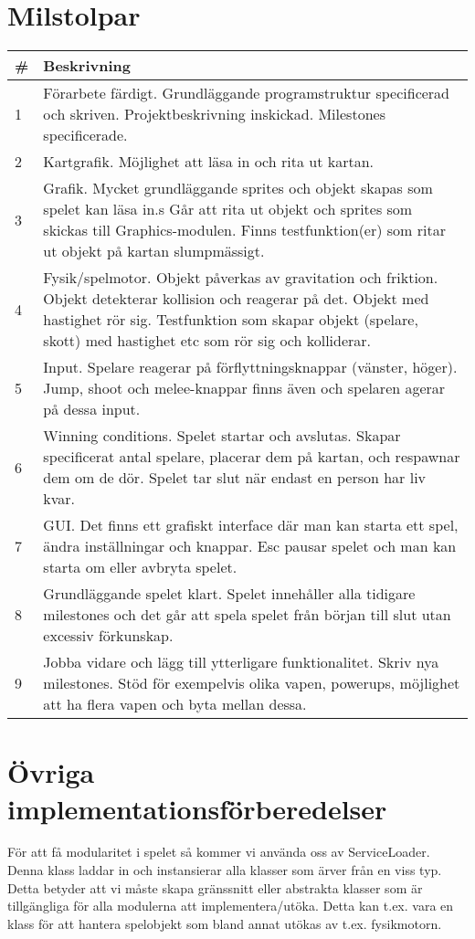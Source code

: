 \section{Milstolpar}
\begin{tabular}{| l | p{11cm} |}
    \hline
    \# & Beskrivning \\ \hline
    1 & Förarbete färdigt. Grundläggande programstruktur specificerad och skriven. Projektbeskrivning inskickad. Milestones specificerade. \\ \hline
    2 & Kartgrafik. Möjlighet att läsa in och rita ut kartan. \\ \hline
    3 & Grafik. Mycket grundläggande sprites och objekt skapas som spelet kan läsa in.s Går att rita ut objekt och sprites som skickas till Graphics-modulen. Finns testfunktion(er) som ritar ut objekt på kartan slumpmässigt. \\ \hline
    4 & Fysik/spelmotor. Objekt påverkas av gravitation och friktion. Objekt detekterar kollision och reagerar på det. Objekt med hastighet rör sig. Testfunktion som skapar objekt (spelare, skott) med hastighet etc som rör sig och kolliderar. \\ \hline
    5 & Input. Spelare reagerar på förflyttningsknappar (vänster, höger). Jump, shoot och melee-knappar finns även och spelaren agerar på dessa input. \\ \hline
    6 & Winning conditions. Spelet startar och avslutas. Skapar specificerat antal spelare, placerar dem på kartan, och respawnar dem om de dör. Spelet tar slut när endast en person har liv kvar. \\ \hline
    7 & GUI. Det finns ett grafiskt interface där man kan starta ett spel, ändra inställningar och knappar. Esc pausar spelet och man kan starta om eller avbryta spelet. \\ \hline
    8 & Grundläggande spelet klart. Spelet innehåller alla tidigare milestones och det går att spela spelet från början till slut utan excessiv förkunskap. \\ \hline
    9 & Jobba vidare och lägg till ytterligare funktionalitet. Skriv nya milestones. Stöd för exempelvis olika vapen, powerups, möjlighet att ha flera vapen och byta mellan dessa. \\ \hline
\end{tabular}
\section{Övriga implementationsförberedelser}
För att få modularitet i spelet så kommer vi använda oss av ServiceLoader. Denna klass laddar in och instansierar alla klasser som ärver från en viss typ. Detta betyder att vi måste skapa gränssnitt eller abstrakta klasser som är tillgängliga för alla modulerna att implementera/utöka. Detta kan t.ex. vara en klass för att hantera spelobjekt som bland annat utökas av t.ex. fysikmotorn.
